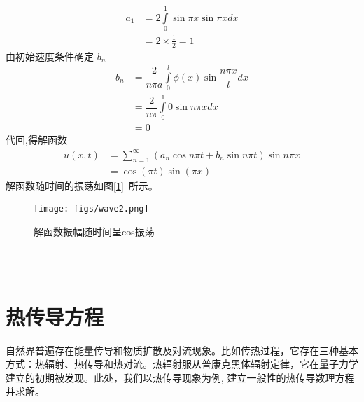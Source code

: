 	$$\begin{aligned}
		a_1
		&= 2 \int\limits_{0 }^{1}  \sin\pi x \sin \pi x dx \\
		&=2\times \frac{1}{2} =1   
\end{aligned}$$ 
由初始速度条件确定 $b_n$  
$$\begin{aligned}
			b_n&= \dfrac{2} { n\pi a} \int\limits_{0 }^{l}  \phi  (x) \sin \dfrac{ n\pi x}{l} dx  \\
			&= \dfrac{2} { n\pi} \int\limits_{0 }^{1}  0  \sin n\pi x dx \\
			&= 0
		\end{aligned}$$ 
代回,得解函数
$$\begin{aligned}
	u(x,t) &= \sum\limits_{n=1}^{\infty }  (a_n\cos n\pi t+ b_n\sin n\pi t ) \sin n\pi x \\
	&= \cos(\pi t) \sin(\pi x) 
    \end{aligned}$$ 
解函数随时间的振荡如图[\ref{fig:wave2}] 所示。
    \begin{figure}[h]
	\centering
	\texttt{[image: figs/wave2.png]}
	\caption{解函数振幅随时间呈cos振荡}
	\label{fig:wave2}
\end{figure}

~~\\ 
~~\\ 

\section{热传导方程}
自然界普遍存在能量传导和物质扩散及对流现象。比如传热过程，它存在三种基本方式：热辐射、热传导和热对流。热辐射服从普康克黑体辐射定律，它在量子力学建立的初期被发现。此处，我们以热传导现象为例, 建立一般性的热传导数理方程并求解。

